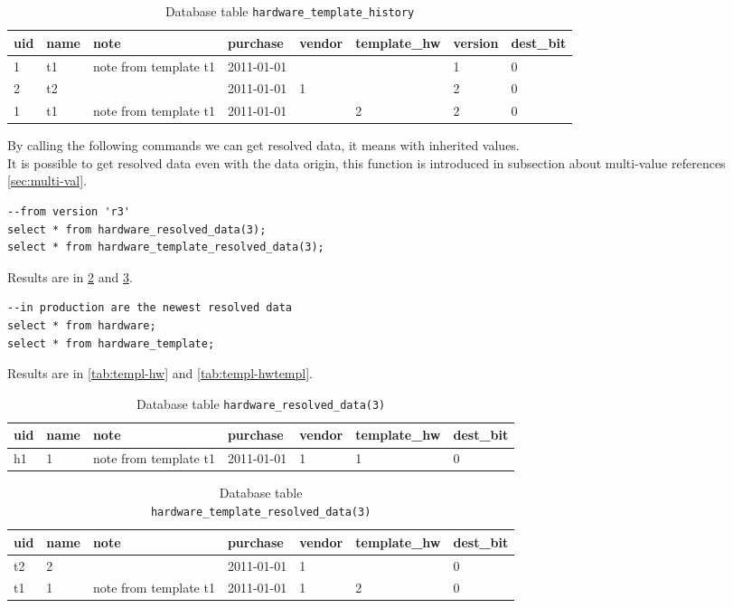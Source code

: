 \documentclass[deska]{subfiles}
\begin{document}
\begin{longtable}{ l | l | l | l | l | l | l | l }
    \caption{Database table {\tt hardware\_template\_history}}
    \label{tab:templ-hwtemplhist} \\
    uid & name & note & purchase & vendor & template\_hw & version & dest\_bit\\
    \hline
    \endhead
    1 & t1 & note from template t1 & 2011-01-01 &  &  & 1 & 0\\
    2 & t2 &  & 2011-01-01 & 1 &  & 2 & 0\\
    1 & t1 & note from template t1 & 2011-01-01 &  & 2 & 2 & 0\\
    \hline
\end{longtable}


By calling the following commands we can get resolved data, it means with inherited values.\\
It is possible to get resolved data even with the data origin, this function is introduced in subsection about multi-value references \ref{sec:multi-val}.
\begin{verbatim}
--from version 'r3'
select * from hardware_resolved_data(3);
select * from hardware_template_resolved_data(3);
\end{verbatim}

Results are in \ref{tab:templ-hwres2} and \ref{tab:templ-hwtemplres2}.

\begin{verbatim}
--in production are the newest resolved data
select * from hardware;
select * from hardware_template;
\end{verbatim}
Results are in \ref{tab:templ-hw} and \ref{tab:templ-hwtempl}.

\begin{longtable}{ l | l | l | l | l | l | l }
    \caption{Database table {\tt hardware\_resolved\_data(3)}}
    \label{tab:templ-hwres2} \\
    uid & name & note & purchase & vendor & template\_hw & dest\_bit\\
    \hline
    \endhead
    h1 & 1 & note from template t1 & 2011-01-01 & 1 & 1 & 0\\
    \hline
\end{longtable}

\begin{longtable}{ l | l | l | l | l | l | l }
    \caption{Database table \\ {\tt hardware\_template\_resolved\_data(3)}}
    \label{tab:templ-hwtemplres2} \\
    uid & name & note & purchase & vendor & template\_hw & dest\_bit\\
    \hline
    \endhead
    t2 & 2 &  & 2011-01-01 & 1 &  & 0\\
    t1 & 1 & note from template t1 & 2011-01-01 & 1 & 2 & 0\\
    \hline
\end{longtable}
\end{document}

